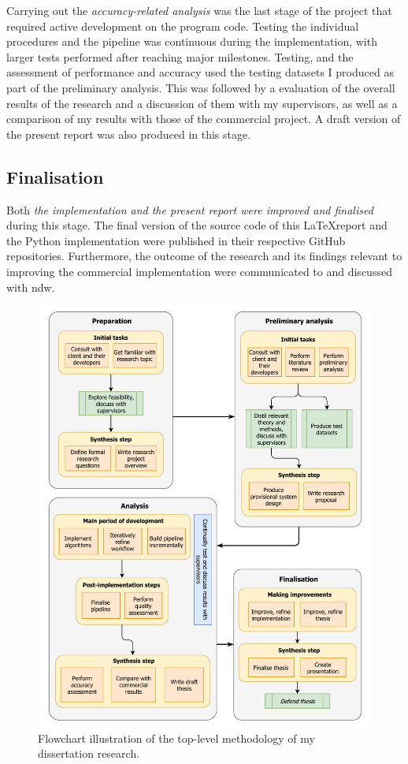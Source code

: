 Carrying out the \textit{accuracy-related analysis} was the last stage of the project that required active development on the program code. Testing the individual procedures and the pipeline was continuous during the implementation, with larger tests performed after reaching major milestones. Testing, and the assessment of performance and accuracy used the testing datasets I produced as part of the preliminary analysis. This was followed by a evaluation of the overall results of the research and a discussion of them with my supervisors, as well as a comparison of my results with those of the commercial project. A draft version of the present report was also produced in this stage.

\subsection{Finalisation}
\label{sub:finalisation}

Both \textit{the implementation and the present report were improved and finalised} during this stage. The final version of the source code of this \LaTeX report and the Python implementation were published in their respective GitHub repositories. Furthermore, the outcome of the research and its findings relevant to improving the commercial implementation were communicated to and discussed with \ac{ndw}.

\begin{figure}
    \centering
    \includegraphics[width=\linewidth]{final_report/figs/methodology.pdf}
    \caption[Illustration of my top-level methodology]{Flowchart illustration of the top-level methodology of my dissertation research.}
    \label{fig:methodologyflow}
\end{figure}

